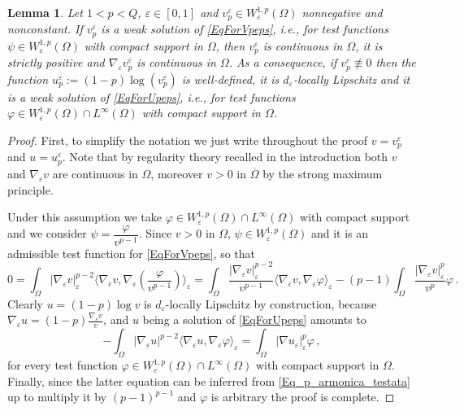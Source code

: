 \documentclass[10pt]{amsart}
\numberwithin{equation}{section}
\newtheorem{lemma}[theorem]{Lemma}
\theoremstyle{definition}
\begin{document}
\begin{lemma}
\label{lem:v_sol_then_u_sol}
Let $1<p<Q$, $\varepsilon \in [0,1]$ and $v^{\varepsilon}_{p} \in W^{1,p}_\varepsilon (\Omega)$ nonnegative and nonconstant. If  $v^{\varepsilon}_{p}$ is a weak solution of \eqref{EqForVpeps}, i.e., for test functions $\psi \in W^{1,p}_\varepsilon (\Omega)$ with compact support in $\Omega$, then $v^{\varepsilon}_{p}$ is continuous in $\Omega$, it is  strictly positive and $\nabla_\varepsilon v^\varepsilon_p $ is continuous in $\Omega$. As a consequence, if $v^\varepsilon_p \not \equiv 0$ then the function $u^{\varepsilon}_{p}:=(1-p)\log(v^{\varepsilon}_{p})$ is well-defined, it is $d_\varepsilon$-locally Lipschitz and it is a weak solution of \eqref{EqForUpeps}, i.e., for test functions $\varphi \in W^{1,p}_\varepsilon (\Omega)\cap L^\infty (\Omega)$ with compact support in $\Omega$.
\end{lemma}
\begin{proof}
First, to simplify the notation we just write throughout the proof  $v=v^{\varepsilon}_{p}$ and $u=u^{\varepsilon}_{p}$. Note that by regularity theory recalled in the introduction both $v$ and $\nabla_\varepsilon v$ are continuous in $\Omega$, moreover $v>0$ in $\overline{\Omega}$ by the strong maximum principle.

 Under this assumption we take $\varphi \in W^{1,p}_\varepsilon (\Omega)\cap L^\infty(\Omega)$ with compact support and we consider $\psi=\dfrac{\varphi}{v^{p-1}}$. Since $v>0$ in $\Omega$, $\psi \in W^{1,p}_\varepsilon (\Omega)$ and it is an admissible test function for \eqref{EqForVpeps}, so that
\begin{equation}\label{Eq_p_armonica_testata}
0=\int_{\Omega}|\nabla_\varepsilon v|_\varepsilon^{p-2}\langle \nabla_\varepsilon v, \nabla_\varepsilon \left(\dfrac{\varphi}{v^{p-1}}\right)\rangle_\varepsilon = \int_{\Omega}\dfrac{|\nabla_\varepsilon v|_\varepsilon^{p-2}}{v^{p-1}}\langle \nabla_\varepsilon v,\nabla_\varepsilon \varphi \rangle_\varepsilon - (p-1)\int_{\Omega}\dfrac{|\nabla_\varepsilon v|_\varepsilon^{p}}{v^{p}}\varphi \, .
\end{equation}
Clearly $u=(1-p)\log v$ is $d_\varepsilon$-locally Lipschitz by construction, because $\nabla_\varepsilon u = (1-p)\tfrac{\nabla_\varepsilon v}{v}$, and $u$ being a solution of \eqref{EqForUpeps} amounts to
\begin{equation*}
-\int_{\Omega}|\nabla_\varepsilon u|^{p-2}\langle \nabla_\varepsilon u, \nabla_\varepsilon \varphi\rangle_\varepsilon = \int_{\Omega}|\nabla u_\varepsilon |_\varepsilon^{p}\varphi \, , \end{equation*}
for every test function $\varphi \in W^{1,p}_\varepsilon (\Omega)\cap L^\infty(\Omega)$ with compact support in $\Omega$. Finally, since the latter equation can be inferred from \eqref{Eq_p_armonica_testata} up to multiply it by $(p-1)^{p-1}$ and $\varphi$ is arbitrary the proof is complete.
\end{proof}
\end{document}
